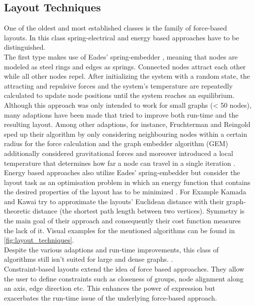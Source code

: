 \subsection{Layout Techniques}
One of the oldest and most established classes is the family of force-based layouts. In this class spring-electrical and energy based approaches have to be distinguished.\\ 
The first type makes use of Eades' spring-embedder \cite{Gibson2013}, meaning that nodes are modeled as steel rings and edges as springs. Connected nodes attract each other while all other nodes repel. After initializing the system with a random state, the attracting and repulsive forces and the system's temperature are repeatedly calculated to update node positions until the system reaches an equilibrium. Although this approach was only intended to work for small graphs (< 50 nodes), many adaptions have been made that tried to improve both run-time and the resulting layout. Among other adaptions, for instance, Fruchterman and Reingold\cite{Fruchterman1991} sped up their algorithm by only considering neighbouring nodes within a certain radius for the force calculation and the graph embedder algorithm (GEM) additionally considered gravitational forces and moreover introduced a local temperature that determines how far a node can travel in a single iteration \cite{Gibson2013}.\\
Energy based approaches also utilize Eades' spring-embedder but consider the layout task as an optimisation problem in which an energy function that contains the desired properties of the layout has to be minimized \cite{Gibson2013}. For Example Kamada and Kawai \cite{Kamada1989} try to approximate the layouts' Euclidean distance with their graph-theoretic distance (the shortest path length between two vertices). Symmetry is the main goal of their approach and consequently their cost function measures the lack of it.
Visual examples for the mentioned algorithms can be found in \autoref{fig:layout_techniques}.\\
Despite the various adaptions and run-time improvements, this class of algorithms still isn't suited for large and dense graphs.\cite{Gibson2013} \cite{VonLandesberger2011}.
\\
Constraint-based layouts extend the idea of force based approaches. They allow the user to define constraints such as closeness of groups, node alignment along an axis, edge direction etc. This enhances the power of expression but exacerbates the run-time issue of the underlying force-based approach\cite{VonLandesberger2011}.


